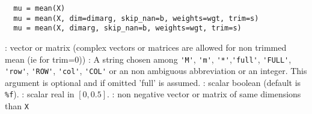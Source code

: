 
\begin{mandesc}
\end{mandesc}

\begin{calling_sequence}
\begin{verbatim}
  mu = mean(X)
  mu = mean(X, dim=dimarg, skip_nan=b, weights=wgt, trim=s)  
  mu = mean(X, dimarg, skip_nan=b, weights=wgt, trim=s)  
\end{verbatim}
\end{calling_sequence}
\begin{parameters}
  \begin{varlist}
    : vector or matrix (complex vectors or matrices are allowed for non trimmed mean (ie for trim=0))
    : A string chosen among \verb+'M'+, \verb+'m'+, \verb+'*'+,\verb+'full'+, \verb+'FULL'+, \verb+'row'+,
    \verb+'ROW'+, \verb+'col'+, \verb+'COL'+ or an non ambiguous abbreviation or an integer. 
    This argument is optional and if omitted 'full' is assumed.
    : scalar boolean (default is \verb+%f+).
    : scalar real in $[0,0.5]$.
    : non negative vector or matrix of same dimensions than \verb+X+
  \end{varlist}
\end{parameters}

